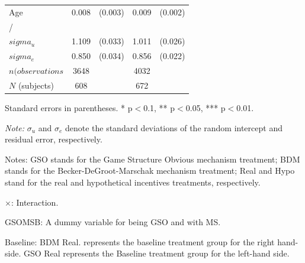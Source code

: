 \documentclass[12pt]{article}
\newcommand{\sym}[1]{\rlap{$^{#1}$}}
\begin{document}
\begin{table}[H]
{\begin{tabular}{l*{2}{cc}}
Age         &       0.008\sym{***}&     (0.003)&       0.009\sym{***}&     (0.002)\\
/           &                     &            &                     &            \\
$sigma_u $    &       1.109\sym{***}&     (0.033)&       1.011\sym{***}&     (0.026)\\
$sigma_e $    &       0.850\sym{***}&     (0.034)&       0.856\sym{***}&     (0.022)\\
\hline
\(n (observations\)       &        3648         &            &        4032         &            \\

\(N\) (subjects)       &       608        &            &        672         &            \\

\end{tabular}
}


\begin{tablenotes}
            \footnotesize
            \item Standard errors in parentheses. * p$<$0.1, ** p$<$0.05, *** p$<$0.01.
            \item \textit{Note:} $\sigma_u$ and $\sigma_e$ denote the standard deviations of the random intercept and residual error, respectively.
            \item Notes: GSO stands for the Game Structure Obvious mechanism treatment; BDM stands for the Becker-DeGroot-Marschak mechanism treatment; Real and Hypo stand for the real and hypothetical incentives treatments, respectively.
           \item $\times$: Interaction.
           \item GSOMSB: A dummy variable for being GSO and with MS.
           \item Baseline: BDM Real. represents the baseline treatment group for the right hand-side. 
           GSO Real represents the Baseline treatment group for the left-hand side.
        \end{tablenotes}
\end{table}
\clearpage
\end{document}
